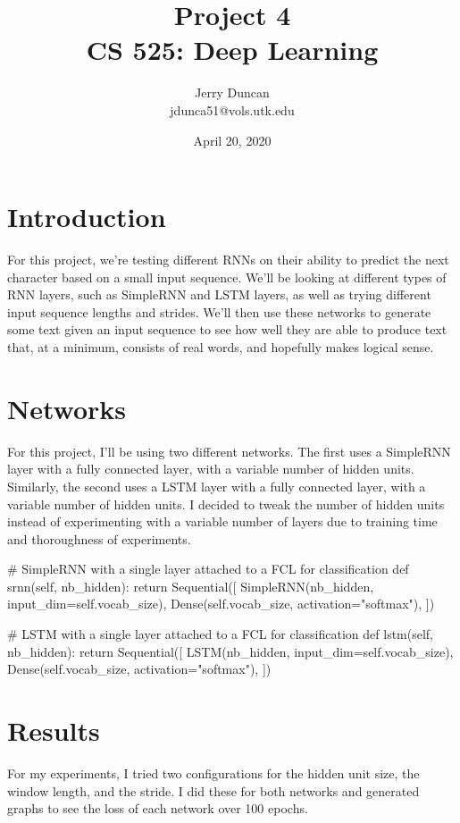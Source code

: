 \documentclass[12pt]{article}
\title{Project 4 \\\vspace{1em}
\large CS 525: Deep Learning}
\author{
  Jerry Duncan \\
  jdunca51@vols.utk.edu
}
\date{April 20, 2020}
\begin{document}
\maketitle
\pagebreak

\section{Introduction}

For this project, we're testing different RNNs on their ability to predict the next character based on a small input sequence.
We'll be looking at different types of RNN layers, such as SimpleRNN and LSTM layers, as well as trying different input sequence lengths and strides.
We'll then use these networks to generate some text given an input sequence to see how well they are able to produce text that, at a minimum, consists of real words, and hopefully makes logical sense.

\section{Networks}

For this project, I'll be using two different networks.
The first uses a SimpleRNN layer with a fully connected layer, with a variable number of hidden units.
Similarly, the second uses a LSTM layer with a fully connected layer, with a variable number of hidden units.
I decided to tweak the number of hidden units instead of experimenting with a variable number of layers due to training time and thoroughness of experiments.
\begin{python}
  # SimpleRNN with a single layer attached to a FCL for classification
  def srnn(self, nb_hidden):
  return Sequential([
      SimpleRNN(nb_hidden, input_dim=self.vocab_size),
      Dense(self.vocab_size, activation="softmax"),
    ])
\end{python}
\begin{python}
  # LSTM with a single layer attached to a FCL for classification
  def lstm(self, nb_hidden):
  return Sequential([
      LSTM(nb_hidden, input_dim=self.vocab_size),
      Dense(self.vocab_size, activation="softmax"),
    ])
\end{python}

\section{Results}

For my experiments, I tried two configurations for the hidden unit size, the window length, and the stride.
I did these for both networks and generated graphs to see the loss of each network over 100 epochs.
\end{document}
